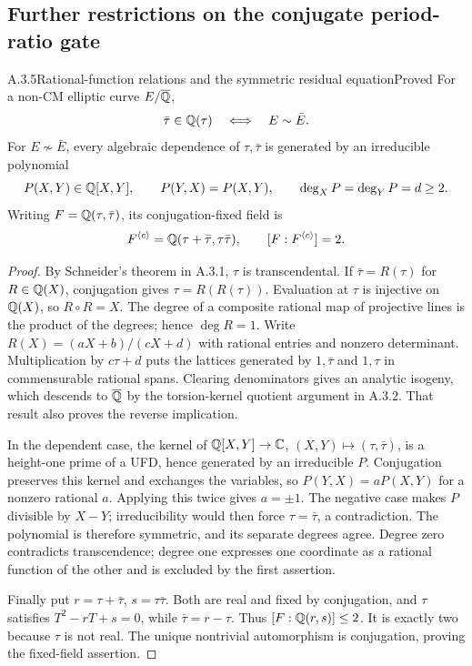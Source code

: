 \subsection{Further restrictions on the conjugate period-ratio gate}

\begin{result}{A.3.5}{Rational-function relations and the symmetric residual equation}{Proved}
For a non-CM elliptic curve $E/\overline{\mathbb Q}$,
\[
 \bar\tau\in\mathbb Q(\tau)\quad\Longleftrightarrow\quad E\sim\bar E.
\]
For $E\not\sim\bar E$, every algebraic dependence of $\tau,\bar\tau$ is generated by an irreducible polynomial
\[
 P(X,Y)\in\mathbb Q[X,Y],\qquad P(Y,X)=P(X,Y),\qquad
 \deg_XP=\deg_YP=d\ge2.
\]
Writing $F=\mathbb Q(\tau,\bar\tau)$, its conjugation-fixed field is
\[
 F^{\langle c\rangle}=\mathbb Q(\tau+\bar\tau,\tau\bar\tau),
 \qquad [F:F^{\langle c\rangle}]=2.
\]
\end{result}
\begin{proof}
By Schneider's theorem in A.3.1, $\tau$ is transcendental. If $\bar\tau=R(\tau)$ for $R\in\mathbb Q(X)$, conjugation gives $\tau=R(R(\tau))$. Evaluation at $\tau$ is injective on $\mathbb Q(X)$, so $R\circ R=X$. The degree of a composite rational map of projective lines is the product of the degrees; hence $\deg R=1$. Write $R(X)=(aX+b)/(cX+d)$ with rational entries and nonzero determinant. Multiplication by $c\tau+d$ puts the lattices generated by $1,\bar\tau$ and $1,\tau$ in commensurable rational spans. Clearing denominators gives an analytic isogeny, which descends to $\overline{\mathbb Q}$ by the torsion-kernel quotient argument in A.3.2. That result also proves the reverse implication.

In the dependent case, the kernel of $\mathbb Q[X,Y]\to\mathbb C$, $(X,Y)\mapsto(\tau,\bar\tau)$, is a height-one prime of a UFD, hence generated by an irreducible $P$. Conjugation preserves this kernel and exchanges the variables, so $P(Y,X)=aP(X,Y)$ for a nonzero rational $a$. Applying this twice gives $a=\pm1$. The negative case makes $P$ divisible by $X-Y$; irreducibility would then force $\tau=\bar\tau$, a contradiction. The polynomial is therefore symmetric, and its separate degrees agree. Degree zero contradicts transcendence; degree one expresses one coordinate as a rational function of the other and is excluded by the first assertion.

Finally put $r=\tau+\bar\tau$, $s=\tau\bar\tau$. Both are real and fixed by conjugation, and $\tau$ satisfies $T^2-rT+s=0$, while $\bar\tau=r-\tau$. Thus $[F:\mathbb Q(r,s)]\le2$. It is exactly two because $\tau$ is not real. The unique nontrivial automorphism is conjugation, proving the fixed-field assertion.
\end{proof}

